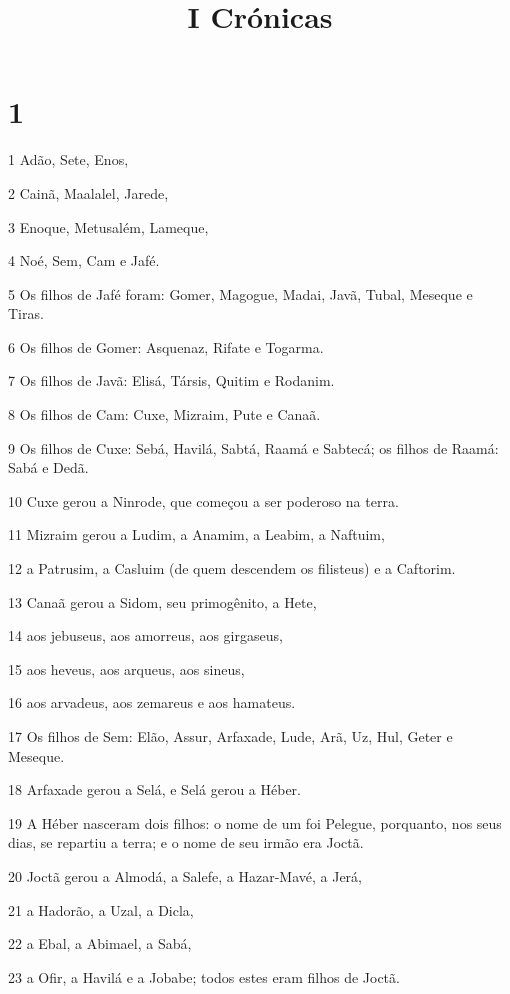 

\title{I Crónicas}


\chapter{1}

\par 1 Adão, Sete, Enos,
\par 2 Cainã, Maalalel, Jarede,
\par 3 Enoque, Metusalém, Lameque,
\par 4 Noé, Sem, Cam e Jafé.
\par 5 Os filhos de Jafé foram: Gomer, Magogue, Madai, Javã, Tubal, Meseque e Tiras.
\par 6 Os filhos de Gomer: Asquenaz, Rifate e Togarma.
\par 7 Os filhos de Javã: Elisá, Társis, Quitim e Rodanim.
\par 8 Os filhos de Cam: Cuxe, Mizraim, Pute e Canaã.
\par 9 Os filhos de Cuxe: Sebá, Havilá, Sabtá, Raamá e Sabtecá; os filhos de Raamá: Sabá e Dedã.
\par 10 Cuxe gerou a Ninrode, que começou a ser poderoso na terra.
\par 11 Mizraim gerou a Ludim, a Anamim, a Leabim, a Naftuim,
\par 12 a Patrusim, a Casluim (de quem descendem os filisteus) e a Caftorim.
\par 13 Canaã gerou a Sidom, seu primogênito, a Hete,
\par 14 aos jebuseus, aos amorreus, aos girgaseus,
\par 15 aos heveus, aos arqueus, aos sineus,
\par 16 aos arvadeus, aos zemareus e aos hamateus.
\par 17 Os filhos de Sem: Elão, Assur, Arfaxade, Lude, Arã, Uz, Hul, Geter e Meseque.
\par 18 Arfaxade gerou a Selá, e Selá gerou a Héber.
\par 19 A Héber nasceram dois filhos: o nome de um foi Pelegue, porquanto, nos seus dias, se repartiu a terra; e o nome de seu irmão era Joctã.
\par 20 Joctã gerou a Almodá, a Salefe, a Hazar-Mavé, a Jerá,
\par 21 a Hadorão, a Uzal, a Dicla,
\par 22 a Ebal, a Abimael, a Sabá,
\par 23 a Ofir, a Havilá e a Jobabe; todos estes eram filhos de Joctã.
